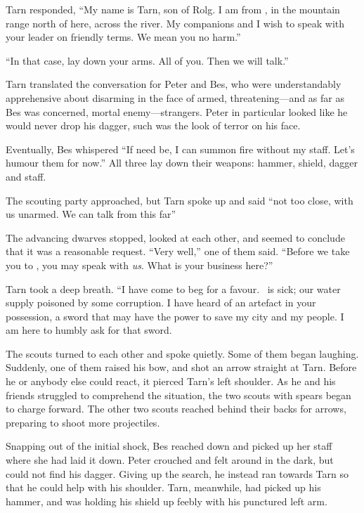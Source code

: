 Tarn responded, ``My name is Tarn, son of Rolg.  I am from \korbarthrond, in the mountain range north of here, across the river.  My companions and I wish to speak with your leader on friendly terms.  We mean you no harm.''

``In that case, lay down your arms.  All of you.  Then we will talk.''

Tarn translated the conversation for Peter and Bes, who were understandably apprehensive about disarming in the face of armed, threatening---and as far as Bes was concerned, mortal enemy---strangers.  Peter in particular looked like he would never drop his dagger, such was the look of terror on his face.

Eventually, Bes whispered ``If need be, I can summon fire without my staff.  Let's humour them for now.''  All three lay down their weapons: hammer, shield, dagger and staff.

The scouting party approached, but Tarn spoke up and said ``not too close, with us unarmed.  We can talk from this far''

The advancing dwarves stopped, looked at each other, and seemed to conclude that it was a reasonable request.  ``Very well,'' one of them said.  ``Before we take you to \tholkunrond, you may speak with \emph{us}.  What is your business here?''

Tarn took a deep breath.  ``I have come to beg for a favour.  \korbarthrond\ is sick; our water supply poisoned by some corruption.  I have heard of an artefact in your possession, a sword that may have the power to save my city and my people.  I am here to humbly ask for that sword.

The scouts turned to each other and spoke quietly.  Some of them began laughing.  Suddenly, one of them raised his bow, and shot an arrow straight at Tarn.  Before he or anybody else could react, it pierced Tarn's left shoulder.  As he and his friends struggled to comprehend the situation, the two scouts with spears began to charge forward.  The other two scouts reached behind their backs for arrows, preparing to shoot more projectiles.

Snapping out of the initial shock, Bes reached down and picked up her staff where she had laid it down.  Peter crouched and felt around in the dark, but could not find his dagger.  Giving up the search, he instead ran towards Tarn so that he could help with his shoulder.  Tarn, meanwhile, had picked up his hammer, and was holding his shield up feebly with his punctured left arm.

